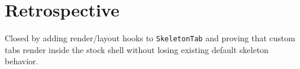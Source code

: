 \section{Retrospective}\label{record-130-retrospective}

Closed by adding render/layout hooks to \texttt{S\allowbreak{}k\allowbreak{}e\allowbreak{}l\allowbreak{}e\allowbreak{}t\allowbreak{}o\allowbreak{}n\allowbreak{}T\allowbreak{}a\allowbreak{}b} and proving that custom tabs render inside the stock shell without losing existing default skeleton behavior.

